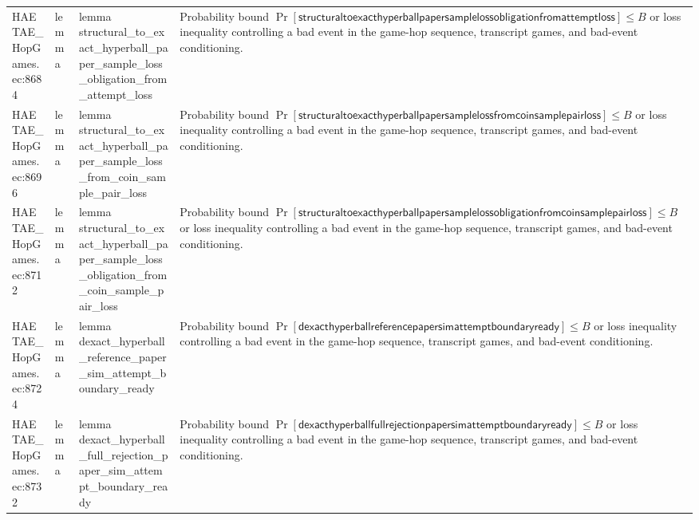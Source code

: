 \documentclass[10pt]{article}
\begin{document}
\begin{longtable}{L{0.11\textwidth}L{0.055\textwidth}L{0.385\textwidth}L{0.41\textwidth}}
HAETAE\_\allowbreak{}HopGames.\allowbreak{}ec:\allowbreak{}8684 & lemma & {\ttfamily\scriptsize lemma structural\_\allowbreak{}to\_\allowbreak{}exact\_\allowbreak{}hyperball\_\allowbreak{}paper\_\allowbreak{}sample\_\allowbreak{}loss\_\allowbreak{}obligation\_\allowbreak{}from\_\allowbreak{}attempt\_\allowbreak{}loss} & Probability bound $\Pr[\mathsf{structuraltoexacthyperballpapersamplelossobligationfromattemptloss}]\le B$ or loss inequality controlling a bad event in the game-hop sequence, transcript games, and bad-event conditioning. \\
HAETAE\_\allowbreak{}HopGames.\allowbreak{}ec:\allowbreak{}8696 & lemma & {\ttfamily\scriptsize lemma structural\_\allowbreak{}to\_\allowbreak{}exact\_\allowbreak{}hyperball\_\allowbreak{}paper\_\allowbreak{}sample\_\allowbreak{}loss\_\allowbreak{}from\_\allowbreak{}coin\_\allowbreak{}sample\_\allowbreak{}pair\_\allowbreak{}loss} & Probability bound $\Pr[\mathsf{structuraltoexacthyperballpapersamplelossfromcoinsamplepairloss}]\le B$ or loss inequality controlling a bad event in the game-hop sequence, transcript games, and bad-event conditioning. \\
HAETAE\_\allowbreak{}HopGames.\allowbreak{}ec:\allowbreak{}8712 & lemma & {\ttfamily\scriptsize lemma structural\_\allowbreak{}to\_\allowbreak{}exact\_\allowbreak{}hyperball\_\allowbreak{}paper\_\allowbreak{}sample\_\allowbreak{}loss\_\allowbreak{}obligation\_\allowbreak{}from\_\allowbreak{}coin\_\allowbreak{}sample\_\allowbreak{}pair\_\allowbreak{}loss} & Probability bound $\Pr[\mathsf{structuraltoexacthyperballpapersamplelossobligationfromcoinsamplepairloss}]\le B$ or loss inequality controlling a bad event in the game-hop sequence, transcript games, and bad-event conditioning. \\
HAETAE\_\allowbreak{}HopGames.\allowbreak{}ec:\allowbreak{}8724 & lemma & {\ttfamily\scriptsize lemma dexact\_\allowbreak{}hyperball\_\allowbreak{}reference\_\allowbreak{}paper\_\allowbreak{}sim\_\allowbreak{}attempt\_\allowbreak{}boundary\_\allowbreak{}ready} & Probability bound $\Pr[\mathsf{dexacthyperballreferencepapersimattemptboundaryready}]\le B$ or loss inequality controlling a bad event in the game-hop sequence, transcript games, and bad-event conditioning. \\
HAETAE\_\allowbreak{}HopGames.\allowbreak{}ec:\allowbreak{}8732 & lemma & {\ttfamily\scriptsize lemma dexact\_\allowbreak{}hyperball\_\allowbreak{}full\_\allowbreak{}rejection\_\allowbreak{}paper\_\allowbreak{}sim\_\allowbreak{}attempt\_\allowbreak{}boundary\_\allowbreak{}ready} & Probability bound $\Pr[\mathsf{dexacthyperballfullrejectionpapersimattemptboundaryready}]\le B$ or loss inequality controlling a bad event in the game-hop sequence, transcript games, and bad-event conditioning. \\

\end{longtable}
\end{document}
